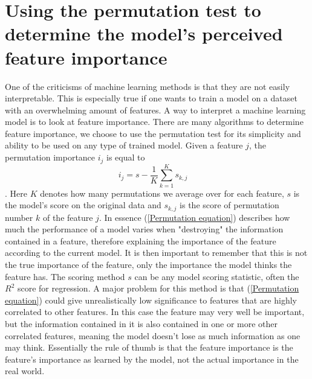 \section{Using the permutation test to determine the model's perceived feature importance}
\label{Feature selection}
One of the criticisms of machine learning methods
is that they are not easily interpretable. This 
is especially true if one wants to train a model 
on a dataset with an overwhelming amount of 
features. 
A way to interpret a machine learning model is to look at feature importance. There 
are many algorithms to determine feature importance, we choose to use the permutation 
test for its simplicity and ability to be used on any type of trained model.
Given a feature $j$, the permutation importance 
$i_j$ is equal to 
\begin{equation}
i_j = s - \frac{1}{K} \sum_{k=1}^K s_{k,j}\quad 
\label{Permutation equation}
\end{equation}
\citep{permutation} \citep{breiman2001random}.
Here $K$ denotes how many permutations we average over for each feature, $s$ is
the model's score on the original data and $s_{k,j}$ is the score of permutation 
number $k$ of the feature $j$. In essence (\ref{Permutation equation}) describes 
how much the performance of a model varies when "destroying" the information 
contained in a feature, therefore explaining the importance of the feature 
according to the current model. It is then important to remember that this is not 
the true importance of the feature, only the importance the model thinks the feature 
has. The scoring method $s$ can be any model scoring statistic, often the $R^2$
score for regression.
A major problem for this method is that (\ref{Permutation equation}) could give 
unrealistically low significance to features that are highly correlated to other 
features. In this case the feature may very well be important, but the information 
contained in it is also contained in one or more other correlated features, meaning 
the model doesn't lose as much information as one may think. Essentially the rule 
of thumb is that the feature importance is the feature's importance as learned by 
the model, not the actual importance in the real world. 
